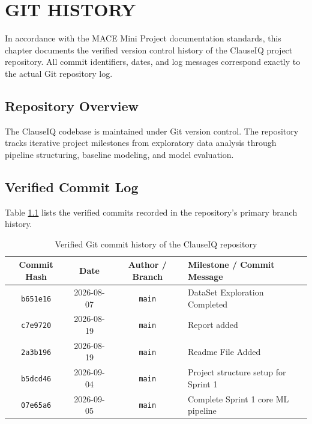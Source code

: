 \chapter{GIT HISTORY}
\label{ch:git_history}

In accordance with the MACE Mini Project documentation standards, this chapter documents the verified version control history of the ClauseIQ project repository. All commit identifiers, dates, and log messages correspond exactly to the actual Git repository log.

\section{Repository Overview}
\label{sec:repo_overview}
The ClauseIQ codebase is maintained under Git version control. The repository tracks iterative project milestones from exploratory data analysis through pipeline structuring, baseline modeling, and model evaluation.

\section{Verified Commit Log}
\label{sec:commit_log}
Table \ref{tab:git_commits} lists the verified commits recorded in the repository's primary branch history.

\begin{table}[h!]
\centering
\small
\begin{tabular}{cccl}
\toprule
\textbf{Commit Hash} & \textbf{Date} & \textbf{Author / Branch} & \textbf{Milestone / Commit Message} \\
\midrule
\texttt{b651e16} & 2026-08-07 & \texttt{main} & DataSet Exploration Completed \\
\texttt{c7e9720} & 2026-08-19 & \texttt{main} & Report added \\
\texttt{2a3b196} & 2026-08-19 & \texttt{main} & Readme File Added \\
\texttt{b5dcd46} & 2026-09-04 & \texttt{main} & Project structure setup for Sprint 1 \\
\texttt{07e65a6} & 2026-09-05 & \texttt{main} & Complete Sprint 1 core ML pipeline \\
\bottomrule
\end{tabular}
\caption{Verified Git commit history of the ClauseIQ repository}
\label{tab:git_commits}
\end{table}

